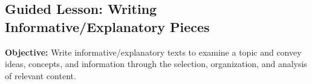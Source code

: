 \documentclass[12pt]{article}
\begin{document}
\subsection*{Guided Lesson: Writing Informative/Explanatory Pieces}
\onehalfspacing

\begin{tcolorbox}[colframe=black!40, colback=gray!5, 
coltitle=black, colbacktitle=black!20, fonttitle=\bfseries\Large, 
title=Learning Objective, halign title=center, left=5pt, right=5pt, top=5pt, bottom=15pt]
\textbf{Objective:} Write informative/explanatory texts to examine a topic and convey ideas, concepts, and information through the selection, organization, and analysis of relevant content.
\end{tcolorbox}

\vspace{1em}
\end{document}
